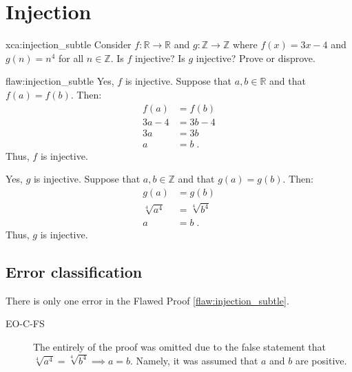 \section{Injection}

\begin{xca}{xca:injection_subtle}
Consider $f: \mathbb{R} \rightarrow \mathbb{R}$ and $g: \mathbb{Z} \rightarrow \mathbb{Z}$ where $f(x) = 3x-4$ and $g(n) = n^4$ for all $n \in \mathbb{Z}.$ Is $f$ injective? Is $g$ injective? Prove or disprove.
\end{xca}

\begin{flaw}{flaw:injection_subtle} %
Yes, $f$ is injective. Suppose that $a, b \in \mathbb{R}$ and that $f(a) = f(b)$. Then:
\begin{align*}
    f(a) &= f(b) \\
    3a-4 &= 3b-4 \\
    3a &= 3b \\
    a &= b\;.
\end{align*}
Thus, $f$ is injective. 

Yes, $g$ is injective. Suppose that $a, b \in \mathbb{Z}$ and that $g(a) = g(b)$. Then:
\begin{align*}
    g(a) &= g(b) \\
    \sqrt[4]{a^4} &= \sqrt[4]{b^4} \\
    a &= b \;.
\end{align*}
Thus, $g$ is injective. 
\end{flaw}

\clearpage
\subsection{Error classification}


There is only one error
 in the Flawed Proof \ref{flaw:injection_subtle}. %

 
 \begin{description}
 	\item[EO-C-FS] The entirely of the proof was omitted due to the false statement that $\sqrt[4]{a^4} = \sqrt[4]{b^4} \implies
    a = b.$ Namely, it was assumed that $a$ and $b$	are positive.
 \end{description}

